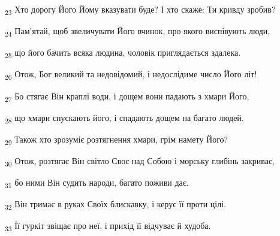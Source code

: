 \begin{tcolorbox}
\textsubscript{23} Хто дорогу Його Йому вказувати буде? І хто скаже: Ти кривду зробив?
\end{tcolorbox}
\begin{tcolorbox}
\textsubscript{24} Пам'ятай, щоб звеличувати Його вчинок, про якого виспівують люди,
\end{tcolorbox}
\begin{tcolorbox}
\textsubscript{25} що його бачить всяка людина, чоловік приглядається здалека.
\end{tcolorbox}
\begin{tcolorbox}
\textsubscript{26} Отож, Бог великий та недовідомий, і недослідиме число Його літ!
\end{tcolorbox}
\begin{tcolorbox}
\textsubscript{27} Бо стягає Він краплі води, і дощем вони падають з хмари Його,
\end{tcolorbox}
\begin{tcolorbox}
\textsubscript{28} що хмари спускають його, і спадають дощем на багато людей.
\end{tcolorbox}
\begin{tcolorbox}
\textsubscript{29} Також хто зрозуміє розтягнення хмари, грім намету Його?
\end{tcolorbox}
\begin{tcolorbox}
\textsubscript{30} Отож, розтягає Він світло Своє над Собою і морську глибінь закриває,
\end{tcolorbox}
\begin{tcolorbox}
\textsubscript{31} бо ними Він судить народи, багато поживи дає.
\end{tcolorbox}
\begin{tcolorbox}
\textsubscript{32} Він тримає в руках Своїх блискавку, і керує її проти цілі.
\end{tcolorbox}
\begin{tcolorbox}
\textsubscript{33} Її гуркіт звіщає про неї, і прихід її відчуває й худоба.
\end{tcolorbox}
